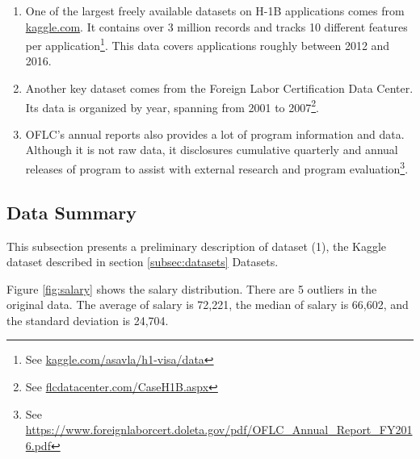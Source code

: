 \documentclass[sigconf]{acmart}
\begin{document}
\begin{enumerate}

\item One of the largest freely available datasets on H-1B applications comes from
\href{https://kaggle.com}{kaggle.com}. It contains over 3 million records and tracks 10 different features
per application\footnote{See \href{https://www.kaggle.com/asavla/h1-visa/data}{kaggle.com/asavla/h1-visa/data}}.
This data covers applications roughly between 2012 and 2016.

\item Another key dataset comes from the Foreign Labor Certification Data Center. Its data is
organized by year, spanning from 2001 to 2007\footnote{See
\href{http://www.flcdatacenter.com/CaseH1B.aspx}{flcdatacenter.com/CaseH1B.aspx}}.

\item OFLC's annual reports also provides a lot of program information and data. Although
it is not raw data, it disclosures cumulative quarterly and annual releases of program to assist
with external research and program evaluation\footnote{See
\href{https://www.foreignlaborcert.doleta.gov/pdf/OFLC_Annual_Report_FY2016.pdf}{https://www.foreignlaborcert.doleta.gov/pdf/OFLC\_Annual\_Report\_FY2016.pdf}}.

\end{enumerate}


\subsection{Data Summary}
This subsection presents a preliminary description of dataset (1), the Kaggle dataset described in
section \ref{subsec:datasets} Datasets.

Figure \ref{fig:salary} shows the salary distribution. There are 5 outliers in the original data.
The average of salary is 72,221, the median of salary is 66,602, and the standard deviation is 24,704.
\end{document}
